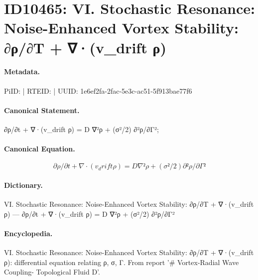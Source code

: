 \section*{ID10465: VI. Stochastic Resonance: Noise-Enhanced Vortex Stability: ∂ρ/∂T + ∇·(v\_drift ρ)}
\paragraph{Metadata.}
PiID:  | RTEID:  | UUID: 1e6ef2fa-2fac-5e3c-ac51-5f913bae77f6

\paragraph{Canonical Statement.}
∂ρ/∂t + ∇·(v\_drift ρ) = D ∇²ρ + (σ²/2) ∂²ρ/∂Γ²;

\paragraph{Canonical Equation.}
\[
∂ρ/∂t + ∇·(v_drift ρ) = D ∇²ρ + (σ²/2) ∂²ρ/∂Γ²
\]

\paragraph{Dictionary.}
VI. Stochastic Resonance: Noise-Enhanced Vortex Stability: ∂ρ/∂T + ∇·(v\_drift ρ) — ∂ρ/∂t + ∇·(v\_drift ρ) = D ∇²ρ + (σ²/2) ∂²ρ/∂Γ²

\paragraph{Encyclopedia.}
VI. Stochastic Resonance: Noise-Enhanced Vortex Stability: ∂ρ/∂T + ∇·(v\_drift ρ): differential equation relating ρ, σ, Γ. From report '\# Vortex-Radial Wave Coupling- Topological Fluid D'.

